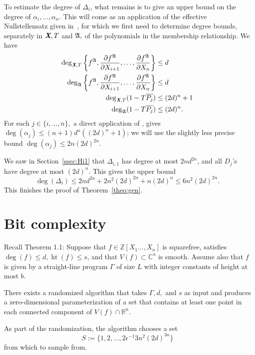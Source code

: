 \documentclass[sigconf]{acmart}
\def\Xb{\textit{\textbf{X}}}
\def\pjb{\overline{P_{j}}}
\DeclareMathOperator{\htt}{ht}
\def\C{\mathbb{C}}
\def\R{\mathbb{R}}
\def\D{\Delta}
\newcommand{\ZZ}{{\mathbb{Z}}}
\def\A{\frak{A}}
\begin{document}
To estimate the degree of $\D_{i}$, what remains is to give an upper
bound on the degree of $\alpha_i,\dots,\alpha_n$. This will come as an
application of the effective Nullstellensatz given in~\cite{EN}, for
which we first need to determine degree bounds, separately in $\Xb,T$
and $\A,$ of the polynomials in the membership relationship. We have
\begin{align*}
\deg_{\Xb,T}\left\{ 
f^\A,\frac{\partial f^\A}{\partial X_{i+1}},\hdots,\frac{\partial f^\A}{\partial X_n}
\right\}&\leq d\\
\deg_{\A}  
\left\{ 
f^\A,\frac{\partial f^\A}{\partial X_{i+1}},\hdots,\frac{\partial f^\A}{\partial X_n}
\right\}& \leq d\\
\deg_{\Xb,T}(1-T\pjb) &\leq (2d)^n +1 \\
\deg_{\A}(1-T\pjb)& \leq (2d)^n.
\end{align*}
For each $j \in \{i,\hdots,n\},$ a direct application of \cite[Theorem
0.5]{EN}, gives $\deg(\alpha_j) \le (n+1)d^n((2d)^n+1)$; we will use
the slightly less precise bound $\deg(\alpha_j) \le 2n(2d)^{2n}$.


We saw in Section~\ref{ssec:Hi1} that $\D_{i,1}$ has degree at most
$2nd^{2n}$, and all $D_j$'s have degree at most $(2d)^n$. This gives
the upper bound
$$\deg(\D_i) \le 2nd^{2n} + 2n^2(2d)^{2n} + n(2d)^n \le 6n^2 (2d)^{2n}.$$
This finishes the proof of Theorem~\ref{theo:gen}.



\section{Bit complexity}
Recall Theorem 1.1:   Suppose that $f\in\ZZ[X_1\hdots,X_n]$ is squarefree, satisfies
  $\deg(f) \leq d, \htt(f) \leq s$, and that $V(f) \subset \C^n$ is
  smooth.  Assume also that $f$ is given by a straight-line program
  $\Gamma$ of size $L$ with integer constants of height at most $b.$

  There exists a randomized algorithm that takes $\Gamma, d,$ and $s$
  as input and produces a zero-dimensional parameterization of a set
  that contains at least one point in each connected component of
  $V(f) \cap \R^n$. 
  
  As part of the randomization, the algorithm chooses a set 
  \[
  S := \{1,2,\hdots,2\epsilon^{-1}3n^2(2d)^{3n}\}
  \]
  from which to sample from. 
  
\end{document}
